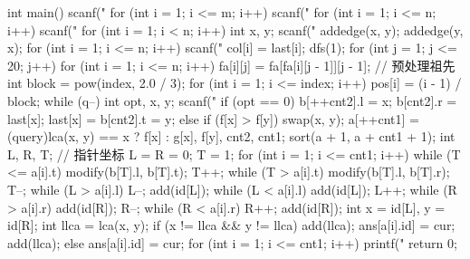 \begin{cppcode}
int main() {
  scanf("%
  for (int i = 1; i <= m; i++) scanf("%
  for (int i = 1; i <= n; i++) scanf("%
  for (int i = 1; i < n; i++) {
    int x, y;
    scanf("%
    addedge(x, y);
    addedge(y, x);
  }
  for (int i = 1; i <= n; i++) {
    scanf("%
    col[i] = last[i];
  }
  dfs(1);
  for (int j = 1; j <= 20; j++)
    for (int i = 1; i <= n; i++)
      fa[i][j] = fa[fa[i][j - 1]][j - 1];  // 预处理祖先
  int block = pow(index, 2.0 / 3);
  for (int i = 1; i <= index; i++) {
    pos[i] = (i - 1) / block;
  }
  while (q--) {
    int opt, x, y;
    scanf("%
    if (opt == 0) {
      b[++cnt2].l = x;
      b[cnt2].r = last[x];
      last[x] = b[cnt2].t = y;
    } else {
      if (f[x] > f[y]) swap(x, y);
      a[++cnt1] = (query){lca(x, y) == x ? f[x] : g[x], f[y], cnt2, cnt1};
    }
  }
  sort(a + 1, a + cnt1 + 1);
  int L, R, T;  // 指针坐标
  L = R = 0;
  T = 1;
  for (int i = 1; i <= cnt1; i++) {
    while (T <= a[i].t) {
      modify(b[T].l, b[T].t);
      T++;
    }
    while (T > a[i].t) {
      modify(b[T].l, b[T].r);
      T--;
    }
    while (L > a[i].l) {
      L--;
      add(id[L]);
    }
    while (L < a[i].l) {
      add(id[L]);
      L++;
    }
    while (R > a[i].r) {
      add(id[R]);
      R--;
    }
    while (R < a[i].r) {
      R++;
      add(id[R]);
    }
    int x = id[L], y = id[R];
    int llca = lca(x, y);
    if (x != llca && y != llca) {
      add(llca);
      ans[a[i].id] = cur;
      add(llca);
    } else
      ans[a[i].id] = cur;
  }
  for (int i = 1; i <= cnt1; i++) {
    printf("%
  }
  return 0;
}
\end{cppcode}
